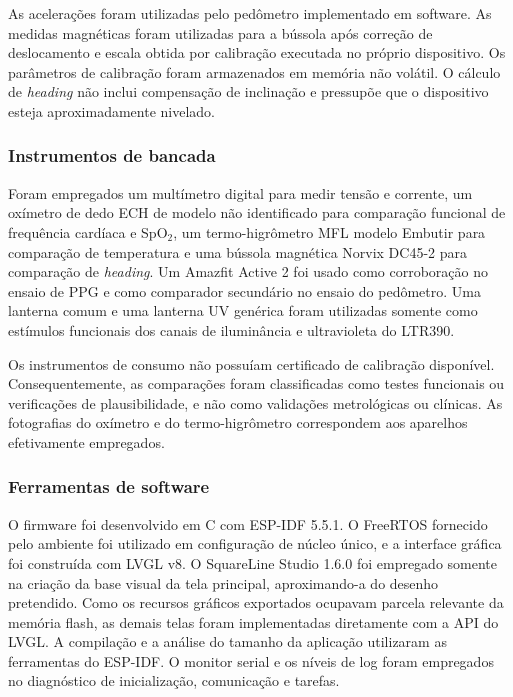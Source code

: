 \documentclass[a4paper,12pt]{article}
\begin{document}
As acelera\c{c}\~oes foram utilizadas pelo ped\^ometro implementado em software. As medidas magn\'eticas foram utilizadas para a b\'ussola ap\'os corre\c{c}\~ao de deslocamento e escala obtida por calibra\c{c}\~ao executada no pr\'oprio dispositivo. Os par\^ametros de calibra\c{c}\~ao foram armazenados em mem\'oria n\~ao vol\'atil. O c\'alculo de \emph{heading} n\~ao inclui compensa\c{c}\~ao de inclina\c{c}\~ao e pressup\~oe que o dispositivo esteja aproximadamente nivelado.


\subsubsection{Instrumentos de bancada}

Foram empregados um mult\'imetro digital para medir tens\~ao e corrente, um ox\'imetro de dedo ECH de modelo n\~ao identificado para compara\c{c}\~ao funcional de frequ\^encia card\'iaca e SpO$_2$, um termo-higr\^ometro MFL modelo Embutir para compara\c{c}\~ao de temperatura e uma b\'ussola magn\'etica Norvix DC45-2 para compara\c{c}\~ao de \emph{heading}. Um Amazfit Active 2 foi usado como corrobora\c{c}\~ao no ensaio de PPG e como comparador secund\'ario no ensaio do ped\^ometro. Uma lanterna comum e uma lanterna UV gen\'erica foram utilizadas somente como est\'imulos funcionais dos canais de ilumin\^ancia e ultravioleta do LTR390.

Os instrumentos de consumo n\~ao possu\'iam certificado de calibra\c{c}\~ao dispon\'ivel. Consequentemente, as compara\c{c}\~oes foram classificadas como testes funcionais ou verifica\c{c}\~oes de plausibilidade, e n\~ao como valida\c{c}\~oes metrol\'ogicas ou cl\'inicas. As fotografias do ox\'imetro e do termo-higr\^ometro correspondem aos aparelhos efetivamente empregados.


\subsubsection{Ferramentas de software}


O firmware foi desenvolvido em C com ESP-IDF 5.5.1. O FreeRTOS fornecido pelo ambiente foi utilizado em configura\c{c}\~ao de n\'ucleo \'unico, e a interface gr\'afica foi constru\'ida com LVGL v8. O SquareLine Studio 1.6.0 foi empregado somente na cria\c{c}\~ao da base visual da tela principal, aproximando-a do desenho pretendido. Como os recursos gr\'aficos exportados ocupavam parcela relevante da mem\'oria flash, as demais telas foram implementadas diretamente com a API do LVGL. A compila\c{c}\~ao e a an\'alise do tamanho da aplica\c{c}\~ao utilizaram as ferramentas do ESP-IDF. O monitor serial e os n\'iveis de log foram empregados no diagn\'ostico de inicializa\c{c}\~ao, comunica\c{c}\~ao e tarefas.
\end{document}

